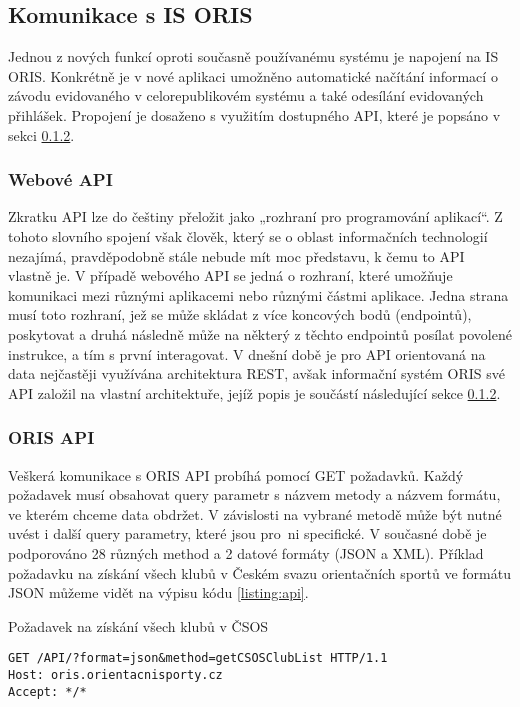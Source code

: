 \subsection{Komunikace s IS ORIS}
Jednou z nových funkcí oproti současně používanému systému je napojení na IS ORIS. Konkrétně je v nové aplikaci umožněno automatické načítání informací o závodu evidovaného v celorepublikovém systému a také odesílání evidovaných přihlášek. Propojení je dosaženo s využitím dostupného API, které je popsáno v sekci \ref{implementation:oris-api}.

\subsubsection{Webové API}\label{implementation:api}
Zkratku API lze do češtiny přeložit jako „rozhraní pro programování aplikací“. Z tohoto slovního spojení však člověk, který se o oblast informačních technologií nezajímá, pravděpodobně stále nebude mít moc představu, k čemu to API vlastně je. V případě webového API se jedná o rozhraní, které umožňuje komunikaci mezi různými aplikacemi nebo různými částmi aplikace. Jedna strana musí toto rozhraní, jež se může skládat z více koncových bodů (endpointů), poskytovat a druhá následně může na některý z těchto endpointů posílat povolené instrukce, a tím s první interagovat. V dnešní době je pro API orientovaná na data nejčastěji využívána architektura REST, avšak informační systém ORIS své API založil na vlastní architektuře, jejíž popis je součástí následující sekce \ref{implementation:oris-api}. \cite{api}

\subsubsection{ORIS API}\label{implementation:oris-api}
Veškerá komunikace s ORIS API probíhá pomocí GET požadavků. Každý požadavek musí obsahovat query parametr s názvem metody a názvem formátu, ve kterém chceme data obdržet. V závislosti na vybrané metodě může být nutné uvést i další query parametry, které jsou pro~ni specifické. V současné době je podporováno 28 různých method a 2 datové formáty (JSON a XML). Příklad požadavku na získání všech klubů v Českém svazu orientačních sportů ve formátu JSON můžeme vidět na výpisu kódu \ref{listing:api}. 

\begin{listing}[h]
    \caption{Požadavek na získání všech klubů v ČSOS}\label{listing:api}
    \begin{verbatim}
GET /API/?format=json&method=getCSOSClubList HTTP/1.1
Host: oris.orientacnisporty.cz
Accept: */*
    \end{verbatim}
\end{listing}

